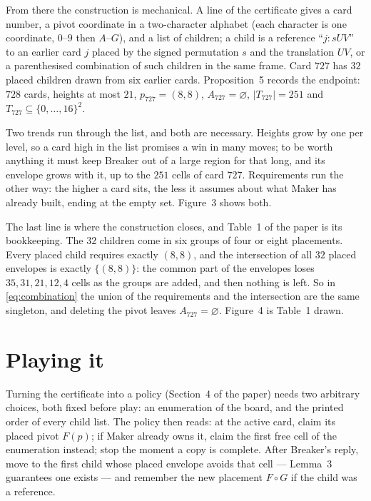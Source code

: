 \documentclass[11pt,a4paper]{article}
\begin{document}
From there the construction is mechanical. A line of the certificate gives a card
number, a pivot coordinate in a two-character alphabet (each character is one
coordinate, $0$--$9$ then $A$--$G$), and a list of children; a child is a
reference ``$j{:}sUV$'' to an earlier card $j$ placed by the signed permutation
$s$ and the translation $UV$, or a parenthesised combination of such children in
the same frame. Card $727$ has $32$ placed children drawn from six earlier cards.
Proposition~5 records the endpoint: $728$ cards, heights at most $21$,
$p_{727}=(8,8)$, $A_{727}=\varnothing$, $|T_{727}|=251$ and
$T_{727}\subseteq\{0,\dots,16\}^2$.

Two trends run through the list, and both are necessary. Heights grow by one per
level, so a card high in the list promises a win in many moves; to be worth
anything it must keep Breaker out of a large region for that long, and its
envelope grows with it, up to the $251$ cells of card $727$. Requirements run the
other way: the higher a card sits, the less it assumes about what Maker has
already built, ending at the empty set. Figure~3 shows both.



The last line is where the construction closes, and Table~1 of the paper is its
bookkeeping. The $32$ children come in six groups of four or eight placements.
Every placed child requires exactly $(8,8)$, and the intersection of all $32$
placed envelopes is exactly $\{(8,8)\}$: the common part of the envelopes loses
$35,31,21,12,4$ cells as the groups are added, and then nothing is left. So in
\eqref{eq:combination} the union of the requirements and the intersection are the
same singleton, and deleting the pivot leaves $A_{727}=\varnothing$. Figure~4 is
Table~1 drawn.



\section{Playing it}

Turning the certificate into a policy (Section~4 of the paper) needs two arbitrary
choices, both fixed before play: an enumeration of the board, and the printed
order of every child list. The policy then reads: at the active card, claim its
placed pivot $F(p)$; if Maker already owns it, claim the first free cell of the
enumeration instead; stop the moment a copy is complete. After Breaker's reply,
move to the first child whose placed envelope avoids that cell --- Lemma~3
guarantees one exists --- and remember the new placement $F\circ G$ if the child
was a reference.
\end{document}
